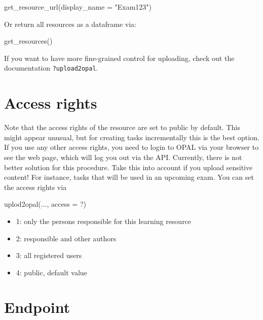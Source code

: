 \documentclass[twoside]{tufte-book}
\newenvironment{Shaded}{}{}
\newcommand{\AttributeTok}[1]{\textcolor[rgb]{0.49,0.56,0.16}{#1}}
\newcommand{\FunctionTok}[1]{\textcolor[rgb]{0.02,0.16,0.49}{#1}}
\newcommand{\NormalTok}[1]{#1}
\newcommand{\StringTok}[1]{\textcolor[rgb]{0.25,0.44,0.63}{#1}}
\providecommand{\tightlist}{%
  \setlength{\itemsep}{0pt}\setlength{\parskip}{0pt}}
\begin{document}
\begin{Shaded}
\begin{Highlighting}[]
\FunctionTok{get\_resource\_url}\NormalTok{(}\AttributeTok{display\_name =} \StringTok{"Exam123"}\NormalTok{)}
\end{Highlighting}
\end{Shaded}

Or return all resources as a dataframe via:

\begin{Shaded}
\begin{Highlighting}[]
\FunctionTok{get\_resources}\NormalTok{()}
\end{Highlighting}
\end{Shaded}

If you want to have more fine-grained control for uploading, check out the documentation \texttt{?upload2opal}.

\section{Access rights}\label{access-rights}

Note that the access rights of the resource are set to public by default. This might appear unusual, but for creating tasks incrementally this is the best option. If you use any other access rights, you need to login to OPAL via your browser to see the web page, which will log you out via the API. Currently, there is not better solution for this procedure. Take this into account if you upload sensitive content! For instance, tasks that will be used in an upcoming exam. You can set the access rights via

\begin{Shaded}
\begin{Highlighting}[]
\FunctionTok{uplod2opal}\NormalTok{(..., }\AttributeTok{access =}\NormalTok{ ?)}
\end{Highlighting}
\end{Shaded}

\begin{itemize}
\tightlist
\item
  1: only the persons responsible for this learning resource
\item
  2: responsible and other authors
\item
  3: all registered users
\item
  4: public, default value
\end{itemize}

\section{Endpoint}\label{endpoint}
\end{document}
